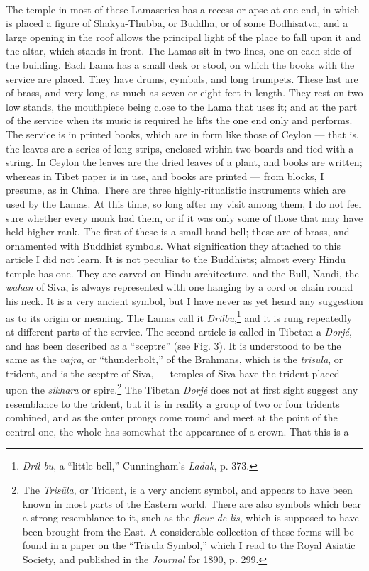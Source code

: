 \documentclass[a4paper, 11pt, oneside, polutonikogreek, english]{article}
\begin{document}
\paragraph{}
The temple in most of these Lamaseries has a recess or apse at one end, in which is placed a figure of Shakya-Thubba, or Buddha, or of some Bodhisatva; and a large opening in the roof allows the principal light of the place to fall upon it and the altar, which stands in front. The Lamas sit in two lines, one on each side of the building. Each Lama has a small desk or stool, on which the books with the service are placed. They have drums, cymbals, and long trumpets. These last are of brass, and very long, as much as seven or eight feet in length. They rest on two low stands, the mouthpiece being close to the Lama that uses it; and at the part of the service when its music is required he lifts the one end only and performs. The service is in printed books, which are in form like those of Ceylon --- that is, the leaves are a series of long strips, enclosed within two boards and tied with a string. In Ceylon the leaves are the dried leaves of a plant, and books are written; whereas in Tibet paper is in use, and books are printed --- from blocks, I presume, as in China. There are three highly-ritualistic instruments which are used by the Lamas. At this time, so long after my visit among them, I do not feel sure whether every monk had them, or if it was only some of those that may have held higher rank. The first of these is a small hand-bell; these are of brass, and ornamented with Buddhist symbols. What signification they attached to this article I did not learn. It is not peculiar to the Buddhists; almost every Hindu temple has one. They are carved on Hindu architecture, and the Bull, Nandi, the \emph{wahan} of Siva, is always represented with one hanging by a cord or chain round his neck. It is a very ancient symbol, but I have never as yet heard any suggestion as to its origin or meaning. The Lamas call it \emph{Drilbu},\footnote{\emph{Dril-bu}, a ``little bell,'' Cunningham's \emph{Ladak}, p. 373.} and it is rung repeatedly at different parts of the service. The second article is called in Tibetan a \emph{Dorjé}, and has been described as a ``sceptre'' (see Fig. 3). It is understood to be the same as the \emph{vajra}, or ``thunderbolt,'' of the Brahmans, which is the \emph{trisula}, or trident, and is the sceptre of Siva, --- temples of Siva have the trident placed upon the \emph{sikhara} or spire.\footnote{The \emph{Trisūla}, or Trident, is a very ancient symbol, and appears to have been known in most parts of the Eastern world. There are also symbols which bear a strong resemblance to it, such as the \emph{fleur-de-lis}, which is supposed to have been brought from the East. A considerable collection of these forms will be found in a paper on the ``Trisula Symbol,'' which I read to the Royal Asiatic Society, and published in the \emph{Journal} for 1890, p. 299.} The Tibetan \emph{Dorjé} does not at first sight suggest any resemblance to the trident, but it is in reality a group of two or four tridents combined, and as the outer prongs come round and meet at the point of the central one, the whole has somewhat the appearance of a crown. That this is a 
\end{document}
